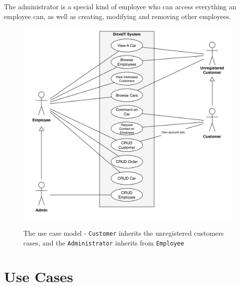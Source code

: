 The administrator is a special kind of employee who can access everything an employee can, as well as creating, modifying and removing other employees.\\

\begin{figure}[h!]
    \centering
        \includegraphics[scale=0.4]{Figures/UseCase-Model}\\
    \caption{The use case model - \texttt{Customer} inherits the unregistered customers cases, and the \texttt{Administrator} inherits from \texttt{Employee}}
  \label{fig:UseCaseModel}
\end{figure}

\section{Use Cases}












